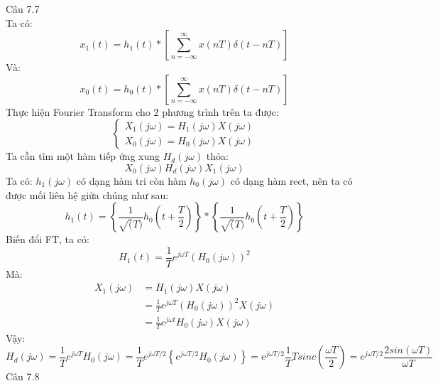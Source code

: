 \documentclass[11pt]{exam}
\begin{document}
\begin{questions}
\question Câu 7.7 \\
    Ta có:
        \begin{equation*}
            x_1(t) = h_1(t) \ast \left[ \sum_{n=-\infty}^{\infty}{x(nT)\delta(t - nT)} \right]
        \end{equation*}
    Và: 
        \begin{equation*}
            x_0(t) = h_0(t) \ast \left[ \sum_{n=-\infty}^{\infty}{x(nT)\delta(t - nT)} \right]
        \end{equation*}
    Thực hiện Fourier Transform cho 2 phương trình trên ta được:
        \begin{equation*}
            \begin{cases}
                X_1(j\omega) = H_1(j\omega)X(j\omega) \\
                X_0(j\omega) = H_0(j\omega)X(j\omega)
            \end{cases}
        \end{equation*}
    Ta cần tìm một hàm tiếp ứng xung $H_d(j\omega)$ thỏa:
        \begin{equation*}
            X_0(j\omega)H_d(j\omega)X_1(j\omega)
        \end{equation*}
    Ta có:
        $ h_1(j\omega) $ có dạng hàm tri còn hàm $ h_0(j\omega) $ có dạng hàm rect, nên ta có được mối liên hệ giữa chúng như sau:
        \begin{equation*}
            h_1(t) = \left\lbrace\frac{1}{\sqrt(T)}h_0(t+\frac{T}{2})\right\rbrace \ast \left\lbrace\frac{1}{\sqrt(T)}h_0(t+\frac{T}{2})\right\rbrace
        \end{equation*}
    Biến đổi FT, ta có:
        \begin{equation*}
            H_1(t) = \frac{1}{T}e^{j\omega T}(H_0(j\omega))^2
        \end{equation*}
    Mà:
        \begin{equation*}
            \begin{aligned}
                X_1(j\omega) &= H_1(j\omega)X(j\omega) \\
                            &= \frac{1}{T}e^{j\omega T}(H_0(j\omega))^2X(j\omega) \\
                            &= \frac{1}{T}e^{j\omega t}H_0(j\omega)X(j\omega)
            \end{aligned}
        \end{equation*}
    Vậy:
        \begin{equation*}
            H_d(j\omega) = \frac{1}{T}e^{j\omega T}H_0(j\omega) = \frac{1}{T}e^{j\omega T/2}\left\lbrace e^{j\omega T/2}H_0(j\omega)\right\rbrace = e^{j\omega T/2}\frac{1}{T}Tsinc(\frac{\omega T}{2}) = e^{j\omega T/2}\frac{2sin(\omega T)}{\omega T}
        \end{equation*}
\question Câu 7.8 \\


\end{questions}
\end{document}
